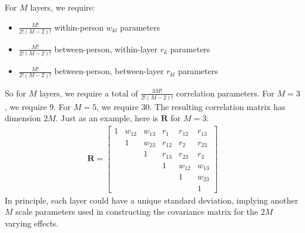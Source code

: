 \documentclass[reqno ,12pt]{amsart}
\begin{document}
For $M$ layers, we require:
\begin{itemize}
\item $\frac{M!}{2!(M-2)!}$ within-person $w_{kl}$ parameters
\item $\frac{M!}{2!(M-2)!}$ between-person, within-layer $r_k$ parameters
\item $\frac{M!}{2!(M-2)!}$ between-person, between-layer $r_{kl}$ parameters
\end{itemize}
So for $M$ layers, we require a total of $\frac{3M!}{2!(M-2)!}$ correlation parameters. For $M=3$, we require 9. For $M=5$, we require 30. The resulting correlation matrix has dimension $2M$. Just as an example, here is $\mathbf{R}$ for $M=3$:
\begin{align*}
\mathbf{R} = \begin{bmatrix} 
	1 & w_{12} & w_{13} & r_{1} & r_{12} & r_{13} \\ 
	 & 1 & w_{23} & r_{12} & r_2 & r_{23} \\ 
	 &  & 1 & r_{13} & r_{23} & r_3 \\ 
	 &  &  & 1 & w_{12} & w_{13} \\
	 &  &  & & 1 & w_{23} \\
	 &  &  &  &  &  1
\end{bmatrix}
\end{align*}
In principle, each layer could have a unique standard deviation, implying another $M$ scale parameters used in constructing the covariance matrix for the $2M$ varying effects.
\end{document}
